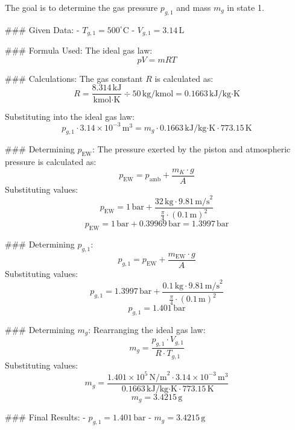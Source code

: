 The goal is to determine the gas pressure \( p_{g,1} \) and mass \( m_g \) in state 1.  

### Given Data:  
- \( T_{g,1} = 500^\circ\text{C} \)  
- \( V_{g,1} = 3.14 \, \text{L} \)  

### Formula Used:  
The ideal gas law:  
\[
pV = mRT
\]  

### Calculations:  
The gas constant \( R \) is calculated as:  
\[
R = \frac{8.314 \, \text{kJ}}{\text{kmol·K}} \div 50 \, \text{kg/kmol} = 0.1663 \, \text{kJ/kg·K}
\]  

Substituting into the ideal gas law:  
\[
p_{g,1} \cdot 3.14 \times 10^{-3} \, \text{m}^3 = m_g \cdot 0.1663 \, \text{kJ/kg·K} \cdot 773.15 \, \text{K}
\]  

### Determining \( p_{\text{EW}} \):  
The pressure exerted by the piston and atmospheric pressure is calculated as:  
\[
p_{\text{EW}} = p_{\text{amb}} + \frac{m_K \cdot g}{A}
\]  
Substituting values:  
\[
p_{\text{EW}} = 1 \, \text{bar} + \frac{32 \, \text{kg} \cdot 9.81 \, \text{m/s}^2}{\frac{\pi}{4} \cdot (0.1 \, \text{m})^2}
\]  
\[
p_{\text{EW}} = 1 \, \text{bar} + 0.39969 \, \text{bar} = 1.3997 \, \text{bar}
\]  

### Determining \( p_{g,1} \):  
\[
p_{g,1} = p_{\text{EW}} + \frac{m_{\text{EW}} \cdot g}{A}
\]  
Substituting values:  
\[
p_{g,1} = 1.3997 \, \text{bar} + \frac{0.1 \, \text{kg} \cdot 9.81 \, \text{m/s}^2}{\frac{\pi}{4} \cdot (0.1 \, \text{m})^2}
\]  
\[
p_{g,1} = 1.401 \, \text{bar}
\]  

### Determining \( m_g \):  
Rearranging the ideal gas law:  
\[
m_g = \frac{p_{g,1} \cdot V_{g,1}}{R \cdot T_{g,1}}
\]  
Substituting values:  
\[
m_g = \frac{1.401 \times 10^5 \, \text{N/m}^2 \cdot 3.14 \times 10^{-3} \, \text{m}^3}{0.1663 \, \text{kJ/kg·K} \cdot 773.15 \, \text{K}}
\]  
\[
m_g = 3.4215 \, \text{g}
\]  

### Final Results:  
- \( p_{g,1} = 1.401 \, \text{bar} \)  
- \( m_g = 3.4215 \, \text{g} \)